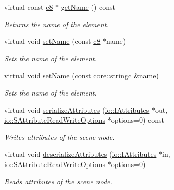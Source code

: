 \begin{DoxyCompactItemize}
virtual const \hyperlink{namespaceirr_a9395eaea339bcb546b319e9c96bf7410}{c8} $\ast$ \hyperlink{classirr_1_1gui_1_1IGUIElement_a308fa8bc16580d53df5c65ded0c1349b}{get\+Name} () const
\begin{DoxyCompactList}\small\item\em Returns the name of the element. \end{DoxyCompactList}\item 
virtual void \hyperlink{classirr_1_1gui_1_1IGUIElement_a47ce14d1a973137b6cbe91a047df2ebe}{set\+Name} (const \hyperlink{namespaceirr_a9395eaea339bcb546b319e9c96bf7410}{c8} $\ast$name)
\begin{DoxyCompactList}\small\item\em Sets the name of the element. \end{DoxyCompactList}\item 
virtual void \hyperlink{classirr_1_1gui_1_1IGUIElement_a5e318b47fece6d4157a1d7ccf401f1c8}{set\+Name} (const \hyperlink{namespaceirr_1_1core_ab26a0e0359206b5a694f35c37c829d7f}{core\+::stringc} \&name)
\begin{DoxyCompactList}\small\item\em Sets the name of the element. \end{DoxyCompactList}\item 
virtual void \hyperlink{classirr_1_1gui_1_1IGUIElement_ac575f2f817b05733dbc667ff298f6e78}{serialize\+Attributes} (\hyperlink{classirr_1_1io_1_1IAttributes}{io\+::\+I\+Attributes} $\ast$out, \hyperlink{structirr_1_1io_1_1SAttributeReadWriteOptions}{io\+::\+S\+Attribute\+Read\+Write\+Options} $\ast$options=0) const
\begin{DoxyCompactList}\small\item\em Writes attributes of the scene node. \end{DoxyCompactList}\item 
virtual void \hyperlink{classirr_1_1gui_1_1IGUIElement_af71b96163b8d95816cd9c80fbf413b4d}{deserialize\+Attributes} (\hyperlink{classirr_1_1io_1_1IAttributes}{io\+::\+I\+Attributes} $\ast$in, \hyperlink{structirr_1_1io_1_1SAttributeReadWriteOptions}{io\+::\+S\+Attribute\+Read\+Write\+Options} $\ast$options=0)
\begin{DoxyCompactList}\small\item\em Reads attributes of the scene node. \end{DoxyCompactList}\item 
\mbox{\label{classirr_1_1gui_1_1IGUIElement_a540fb9b2617696ef421d5510b4d96fea}} 

\end{DoxyCompactItemize}
